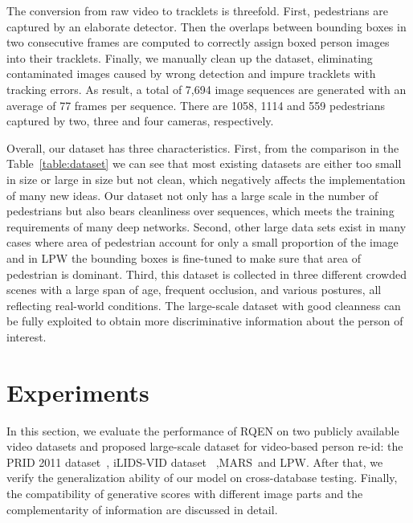 \documentclass[letterpaper]{article} %
\begin{document}
The conversion from raw video to tracklets is threefold. First, pedestrians are captured by an elaborate detector. Then the overlaps between bounding boxes in two consecutive frames are computed to correctly assign boxed person images into their tracklets. Finally, we manually clean up the dataset, eliminating contaminated images caused by wrong detection and impure tracklets with tracking errors. As result, a total of 7,694 image sequences are generated with an average of 77 frames per sequence.
There are 1058, 1114 and 559 pedestrians captured by two, three and four cameras, respectively.

Overall, our dataset has three characteristics. First, from the comparison in the Table~\ref{table:dataset} we can see that most existing datasets are either too small in size or large in size but not clean, which negatively affects the implementation of many new ideas. Our dataset not only has a large scale in the number of pedestrians but also bears cleanliness over sequences, which meets the training requirements of many deep networks. Second, other large data sets exist in many cases where area of pedestrian account for only a small proportion of the image and in LPW the bounding boxes is fine-tuned to make sure that area of pedestrian is dominant. Third, this dataset is collected in three different crowded scenes with a large span of age, frequent occlusion, and various postures, all reflecting real-world conditions. The large-scale dataset with good cleanness can be fully exploited to obtain more discriminative information about the person of interest.


\section{Experiments}

In this section, we evaluate the performance of RQEN on two publicly available video datasets and proposed large-scale dataset for video-based person re-id: the PRID 2011 dataset~\cite{hirzer2011person}, iLIDS-VID dataset~\cite{wang2014person} ,MARS~\cite{zheng2016mars}and LPW. After that, we verify the generalization ability of our model on cross-database testing. Finally, the compatibility of generative scores with different image parts and the complementarity of information are discussed in detail.
\end{document}

